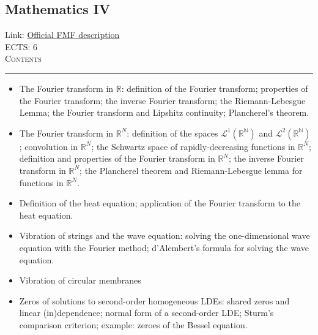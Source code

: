 \documentclass[11pt, a4paper]{article}
\newenvironment{course}[3]{
\subsection{#1}%
Link: \href{#2}{Official FMF description}\\%
ECTS: #3%
\vspace{1ex}
\\
{\large \textsc{Contents}}\\[-0.9ex]%
\rule{\textwidth}{0.5pt}
\vspace{-3ex}
}
{}
\newenvironment{chapter}[1]{
\begin{tcolorbox}[title=#1, breakable]
}
{\end{tcolorbox}}
\begin{document}
\begin{course}{Mathematics IV}{https://www.fmf.uni-lj.si/en/study-physics/programmes/1fiz/2020/7000777/courses/523/}{6}
\begin{chapter}{Fourier analysis}
\begin{itemize}
            \item The Fourier transform in $ \mathbb{R} $: definition of the Fourier transform; properties of the Fourier transform; the inverse Fourier transform; the Riemann-Lebesgue Lemma; the Fourier transform and Lipshitz continuity; Plancherel’s theorem.

            \item The Fourier transform in $ \mathbb{R}^{N} $: definition of the spaces $ \mathcal{L}^{1}(\mathbb{R^{N}}) $ and $ \mathcal{L}^{2}(\mathbb{R^{N}}) $; convolution in $ \mathbb{R}^{N} $; the Schwartz space of rapidly-decreasing functions in $ \mathbb{R}^{N} $; definition and properties of the Fourier transform in $ \mathbb{R}^{N} $; the inverse Fourier transform in $ \mathbb{R}^{N} $; the Plancherel theorem and Riemann-Lebesgue lemma for functions in $ \mathbb{R}^{N} $.

        \end{itemize}
    \end{chapter}

    \begin{chapter}{Partial differential equations}

        \begin{itemize}
            
            \item Definition of the heat equation; application of the Fourier transform to the heat equation.

            \item Vibration of strings and the wave equation: solving the one-dimensional wave equation with the Fourier method; d'Alembert's formula for solving the wave equation.

            \item Vibration of circular membranes
            
        \end{itemize}
    \end{chapter}

    \begin{chapter}{Sturm-Liouville theory and second-order homogeneous LDEs}
        \begin{itemize}
        
            \item Zeros of solutions to second-order homogeneous LDEs: shared zeros and linear (in)dependence; normal form of a second-order LDE; Sturm's comparison criterion; example: zeroes of the Bessel equation.


\end{itemize}
\end{chapter}
\end{course}
\end{document}

